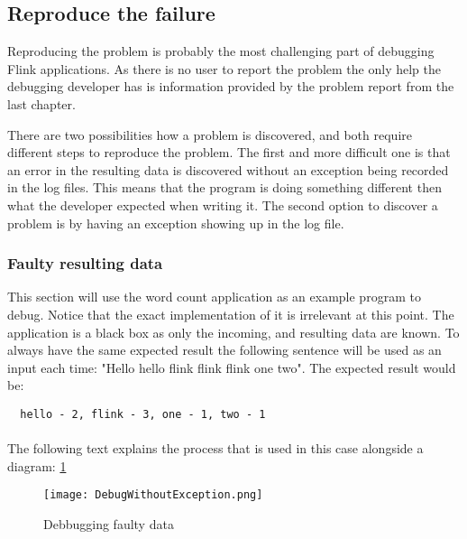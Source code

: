\subsection{Reproduce the failure}
Reproducing the problem is probably the most challenging part of debugging Flink applications. As there is no user to report the problem the only help the debugging developer has is information provided by the problem report from the last chapter.

There are two possibilities how a problem is discovered, and both require different steps to reproduce the problem. The first and more difficult one is that an error in the resulting data is discovered without an exception being recorded in the log files. This means that the program is doing something different then what the developer expected when writing it. The second option to discover a problem is by having an exception showing up in the log file.

\subsubsection{Faulty resulting data}
This section will use the word count application as an example program to debug. Notice that the exact implementation of it is irrelevant at this point. The application is a black box as only the incoming, and resulting data are known. To always have the same expected result the following sentence will be used as an input each time: "Hello hello flink flink flink one two". The expected result would be:
\begin{lstlisting}
  hello - 2, flink - 3, one - 1, two - 1
\end{lstlisting}

\paragraph{} The following text explains the process that is used in this case alongside a diagram: \ref{debuggingFaultyData}

\begin{figure}[h!]
    \centering
      \texttt{[image: DebugWithoutException.png]}
      \caption{Debbugging faulty data}
      \label{debuggingFaultyData}
\end{figure}


